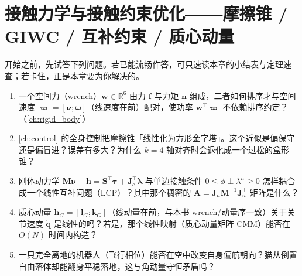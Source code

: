\chapter{接触力学与接触约束优化——摩擦锥 / GIWC / 互补约束 / 质心动量}
\label{ch:contact-mechanics}


\begin{practice}[前置自测]
开始之前，先试答下列问题。若已能流畅作答，可只速读本章的小结表与定理速查；若卡住，正是本章要为你解决的。
\begin{enumerate}
  \item 一个空间力（wrench）$\boldsymbol{w}\in\mathbb{R}^6$ 由力 $\boldsymbol{f}$ 与力矩 $\boldsymbol{n}$ 组成，二者如何排序才与空间速度 $\boldsymbol{\varpi}=[\boldsymbol{\nu};\boldsymbol{\omega}]$（线速度在前）配对，使功率 $\boldsymbol{w}^\top\boldsymbol{\varpi}$ 不依赖排序约定？（\cref{ch:rigid_body}）
  \item \cref{ch:control} 的全身控制把摩擦锥「线性化为方形金字塔」。这个近似是偏保守还是偏冒进？误差有多大？为什么 $k=4$ 轴对齐时会退化成一个过松的盒形锥？
  \item 刚体动力学 $\mathbf{M}\dot{\boldsymbol{\nu}}+\boldsymbol{h}=\mathbf{S}^\top\boldsymbol{\tau}+\mathbf{J}_c^\top\boldsymbol{\lambda}$ 与单边接触条件 $0\le\phi\perp\lambda^n\ge0$ 怎样耦合成一个线性互补问题（LCP）？其中那个稠密的 $\mathbf{A}=\mathbf{J}_n\mathbf{M}^{-1}\mathbf{J}_n^\top$ 矩阵是什么？
  \item 质心动量 $\boldsymbol{h}_G=[\boldsymbol{l}_G;\boldsymbol{k}_G]$（线动量在前，与本书 wrench/动量序一致）关于关节速度 $\dot{\boldsymbol{q}}$ 是线性的吗？若是，那个线性映射（质心动量矩阵 CMM）能否在 $O(N)$ 时间内构造？
  \item 一只完全离地的机器人（飞行相位）能否在空中改变自身偏航朝向？猫从倒置自由落体却能翻身平稳落地，这与角动量守恒矛盾吗？
\end{enumerate}
\end{practice}

